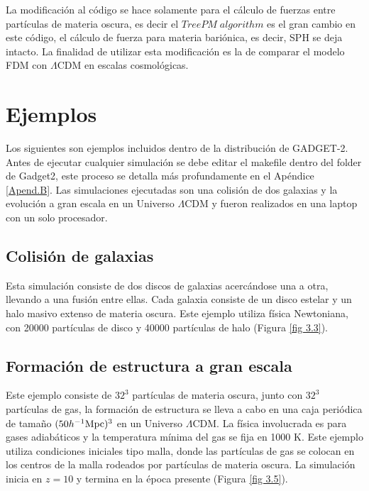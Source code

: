 \documentclass[a4paper,openright,10pt, oneside, final]{book}
\begin{document}
La modificación al código se hace solamente para el cálculo de fuerzas entre partículas de materia oscura, es decir el $TreePM\;algorithm$ es el gran cambio en este código, el cálculo de fuerza para materia bariónica, es decir, SPH se deja intacto. La finalidad de utilizar esta modificación es la de comparar el modelo FDM con $\Lambda$CDM en escalas cosmológicas. 


\section{Ejemplos}
Los siguientes son ejemplos incluidos dentro de la distribución de GADGET-2. Antes de ejecutar cualquier simulación se debe editar el \textsf{makefile} dentro del folder de \textsf{Gadget2}, este proceso se detalla más profundamente en el Apéndice \ref{Apend.B}. Las simulaciones ejecutadas son una colisión de dos galaxias y la evolución a gran escala en un Universo $\Lambda$CDM y fueron realizados en una laptop con un solo procesador.

\subsection{Colisión de galaxias}
Esta simulación consiste de dos discos de galaxias acercándose una a otra, llevando a una fusión entre ellas. Cada galaxia consiste de un disco estelar y un halo masivo extenso de materia oscura. Este ejemplo utiliza física Newtoniana, con 20000 partículas de disco y 40000 partículas de halo (Figura \ref{fig 3.3}). 

\subsection{Formación de estructura a gran escala}
Este ejemplo consiste de $32^{3}$ partículas de materia oscura, junto con $32^{3}$ partículas de gas, la formación de estructura se lleva a cabo en una caja periódica de tamaño $(50 h^{-1} \textup{Mpc})^{3}$ en un Universo $\Lambda$CDM. La física involucrada es para gases adiabáticos y la temperatura mínima del gas se fija en 1000 K. Este ejemplo utiliza condiciones iniciales tipo malla, donde las partículas de gas se colocan en los centros de la malla rodeados por partículas de materia oscura. La simulación inicia en $z = 10$ y termina en la época presente (Figura \ref{fig 3.5}).

\end{document}

